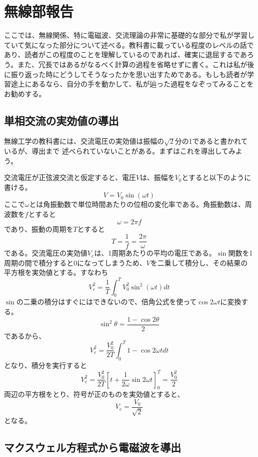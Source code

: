 \chapter{無線部報告}
ここでは、無線関係、特に電磁波、交流理論の非常に基礎的な部分で私が学習していて気になった部分について述べる。教科書に載っている程度のレベルの話であり、読者がこの程度のことを理解しているのであれば、確実に退屈するであろう。また、冗長ではあるがなるべく計算の過程を省略せずに書く。これは私が後に振り返った時にどうしてそうなったかを思い出すためである。もしも読者が学習途上にあるなら、自分の手を動かして、私が辿った過程をなぞってみることをお勧めする。

\section{単相交流の実効値の導出}
無線工学の教科書には、交流電圧の実効値は振幅の$\sqrt{2}$分の1であると書かれているが、導出まで
述べられていないことがある。まずはこれを導出してみよう。

交流電圧が正弦波交流と仮定すると、電圧$V$は、振幅を$V_0$とすると以下のように書ける。
\[
V=V_0 \sin(\omega t)
\]
ここで$\omega$とは角振動数で単位時間あたりの位相の変化率である。角振動数は、周波数を$f$とすると
\[
\omega = 2 \pi f
\]
であり、振動の周期を$T$とすると
\[
T = \frac{1}{f} = \frac{2 \pi}{\omega}
\]
である。交流電圧の実効値$V_e$は、1周期あたりの平均の電圧である。$\sin$関数を1周期の間で積分すると$0$になってしまうため、$V$を二乗して積分し、その結果の平方根を実効値とする。すなわち
\[
V_e^2 =\frac{1}{T} \int_{0}^{T}V_0^2\sin^2(\omega t)dt
\]
$\sin$の二乗の積分はすぐにはできないので、倍角公式を使って$\cos 2\omega t$に変換する。
\[
\sin^2\theta = \frac{1-\cos 2\theta}{2}
\]
であるから、
\[
V_e^2 = \frac{V_0^2}{2T}\int_0^{T} 1 - \cos 2\omega t dt
\]
となり、積分を実行すると
\[
V_e^2 = \frac{V_0^2}{2T}[t + \frac{1}{2 \omega}\sin 2\omega t ]_0^{T} = \frac{V_0^2}{2}
\]
両辺の平方根をとり、符号が正のものを実効値とすると、
\[
V_e = \frac{V_0}{\sqrt{2}}
\]
となる。


\section{マクスウェル方程式から電磁波を導出}
